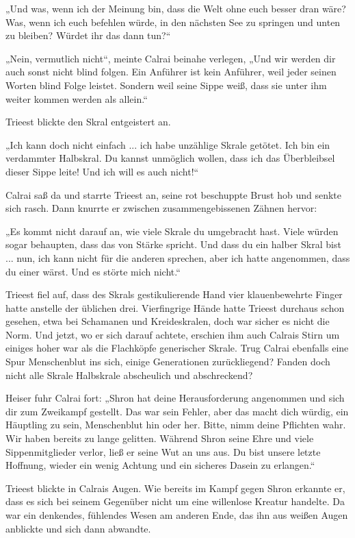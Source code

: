 „Und was, wenn ich der Meinung bin, dass die Welt ohne euch besser dran wäre? Was, wenn ich euch befehlen würde, in den nächsten See zu springen und unten zu bleiben? Würdet ihr das dann tun?“

„Nein, vermutlich nicht“, meinte Calrai beinahe verlegen, „Und wir werden dir auch sonst nicht blind folgen. Ein Anführer ist kein Anführer, weil jeder seinen Worten blind Folge leistet. Sondern weil seine Sippe weiß, dass sie unter ihm weiter kommen werden als allein.“

Trieest blickte den Skral entgeistert an.

„Ich kann doch nicht einfach ... ich habe unzählige Skrale getötet. Ich bin ein verdammter Halbskral. Du kannst unmöglich wollen, dass ich das Überbleibsel dieser Sippe leite! Und ich will es auch nicht!“

Calrai saß da und starrte Trieest an, seine rot beschuppte Brust hob und senkte sich rasch. Dann knurrte er zwischen zusammengebissenen Zähnen hervor:

„Es kommt nicht darauf an, wie viele Skrale du umgebracht hast. Viele würden sogar behaupten, dass das von Stärke spricht. Und dass du ein halber Skral bist ... nun, ich kann nicht für die anderen sprechen, aber ich hatte angenommen, dass du einer wärst. Und es störte mich nicht.“

Trieest fiel auf, dass des Skrals gestikulierende Hand vier klauenbewehrte Finger hatte anstelle der üblichen drei. Vierfingrige Hände hatte Trieest durchaus schon gesehen, etwa bei Schamanen und Kreideskralen, doch war sicher es nicht die Norm. Und jetzt, wo er sich darauf achtete, erschien ihm auch Calrais Stirn um einiges hoher war als die Flachköpfe generischer Skrale. Trug Calrai ebenfalls eine Spur Menschenblut ins sich, einige Generationen zurückliegend? Fanden doch nicht alle Skrale Halbskrale abscheulich und abschreckend?

Heiser fuhr Calrai fort: „Shron hat deine Herausforderung angenommen und sich dir zum Zweikampf gestellt. Das war sein Fehler, aber das macht dich würdig, ein Häuptling zu sein, Menschenblut hin oder her. Bitte, nimm deine Pflichten wahr. Wir haben bereits zu lange gelitten. Während Shron seine Ehre und viele Sippenmitglieder verlor, ließ er seine Wut an uns aus. Du bist unsere letzte Hoffnung, wieder ein wenig Achtung und ein sicheres Dasein zu erlangen.“

Trieest blickte in Calrais Augen. Wie bereits im Kampf gegen Shron erkannte er, dass es sich bei seinem Gegenüber nicht um eine willenlose Kreatur handelte. Da war ein denkendes, fühlendes Wesen am anderen Ende, das ihn aus weißen Augen anblickte und sich dann abwandte.

